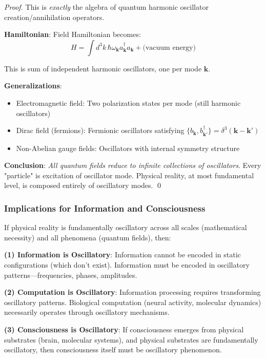 \documentclass[11pt,onecolumn]{article}
\begin{document}
\begin{proof}
This is \textit{exactly} the algebra of quantum harmonic oscillator creation/annihilation operators.

\textbf{Hamiltonian}: Field Hamiltonian becomes:
\begin{equation}
H = \int d^3 k \, \hbar \omega_{\mathbf{k}} a_{\mathbf{k}}^{\dagger} a_{\mathbf{k}} + \text{(vacuum energy)}
\end{equation}

This is sum of independent harmonic oscillators, one per mode $\mathbf{k}$.

\textbf{Generalizations}:
\begin{itemize}
\item Electromagnetic field: Two polarization states per mode (still harmonic oscillators)
\item Dirac field (fermions): Fermionic oscillators satisfying $\{b_{\mathbf{k}}, b_{\mathbf{k}'}^{\dagger}\} = \delta^3(\mathbf{k} - \mathbf{k}')$
\item Non-Abelian gauge fields: Oscillators with internal symmetry structure
\end{itemize}

\textbf{Conclusion}: \textit{All quantum fields reduce to infinite collections of oscillators}. Every "particle" is excitation of oscillator mode. Physical reality, at most fundamental level, is composed entirely of oscillatory modes. \qed
\end{proof}

\subsubsection{Implications for Information and Consciousness}

If physical reality is fundamentally oscillatory across all scales (mathematical necessity) and all phenomena (quantum fields), then:

\textbf{(1) Information is Oscillatory}: Information cannot be encoded in static configurations (which don't exist). Information must be encoded in oscillatory patterns---frequencies, phases, amplitudes.

\textbf{(2) Computation is Oscillatory}: Information processing requires transforming oscillatory patterns. Biological computation (neural activity, molecular dynamics) necessarily operates through oscillatory mechanisms.

\textbf{(3) Consciousness is Oscillatory}: If consciousness emerges from physical substrates (brain, molecular systems), and physical substrates are fundamentally oscillatory, then consciousness itself must be oscillatory phenomenon.
\end{document}
